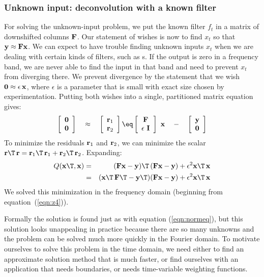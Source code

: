 \subsubsection{Unknown input: deconvolution with a known filter}
For solving the unknown-input problem,
we put the known filter $f_t$ in a matrix of downshifted columns $\bold F$.
Our statement of wishes is now to find $x_t$ so that
$\bold y \approx \bold F \bold x$.
We can expect to have trouble finding unknown inputs $x_t$
when we are dealing with certain kinds of filters,
such as s.
If the output is zero in a frequency band,
we are never able to find the input in that band
and need to prevent $x_t$ from diverging there.
We prevent divergence by the statement that we wish
$\bold 0\approx\epsilon\,\bold x$,
where $\epsilon$ is a parameter that is small
with exact size chosen by experimentation.
Putting both wishes into a single, partitioned matrix equation gives:
\begin{equation}
 \left[ 
  \begin{array}{c}
   \bold 0 \\ 
   \bold 0
  \end{array}
 \right] 
\quad\approx\quad
 \left[ 
  \begin{array}{c}
   \bold r_1 \\ 
   \bold r_2
  \end{array}
 \right] 
\eq
 \left[ 
  \begin{array}{c}
   \bold F \\ 
   \epsilon \  \bold I
  \end{array}
 \right] 
 \ 
 \bold x
\quad - \quad
 \left[ 
  \begin{array}{c}
   \bold y \\ 
   \bold 0
  \end{array}
 \right] 
\end{equation}
To minimize the residuals $\bold r_1$ and $\bold r_2$,
we can minimize the scalar
$\bold r\T\, \bold r = \bold r_1\T\, \bold r_1 + \bold r_2\T\, \bold r_2$.
Expanding:
\begin{eqnarray}
Q(\bold x\T, \bold x) &=& (\bold F  \bold x  - \bold y)\T\,(\bold F\bold x-\bold y)
                                        + \epsilon^2 \bold x\T\,\bold x
                                                                \nonumber \\
                     &=& (\bold x\T\,\bold F\T - \bold y\T) (\bold F\bold x-\bold y)
                                        + \epsilon^2 \bold x\T\,\bold x
\label{eqn:knownfilt}
\end{eqnarray}
We solved this minimization
in the frequency domain
(beginning from equation~(\ref{eqn:z4})).
\par
Formally the solution is found just as with equation (\ref{eqn:normeq}),
but this solution looks unappealing in practice
because there are so many unknowns and 
the problem can be solved much more quickly
in the Fourier domain.
To motivate ourselves to solve this problem in the time domain,
we need either to find an approximate solution method that is
much faster, or find ourselves with an application 
that needs boundaries,
or needs time-variable weighting functions.

